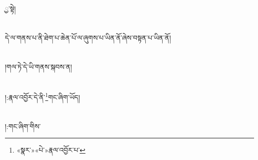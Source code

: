ྱ་སྟེ།\chapter{ }དེ་ལ་གནས་པ་ནི་ཐེག་པ་ཆེན་པོ་ལ་ཞུགས་པ་ཡིན་ནོ་ཞེས་བསྟན་པ་ཡིན་ནོ།\chapter{ }།གལ་ཏེ་དེ་ཡི་གནས་སྐབས་ན།\chapter{ }།:རྣལ་འབྱོར་དེ་ནི་\footnote{«སྣར་»«པེ་»རྣལ་འབྱོར་པ་}གང་ཞིག་ཡོད།\chapter{ }།:གང་ཞིག་གིས་\foot